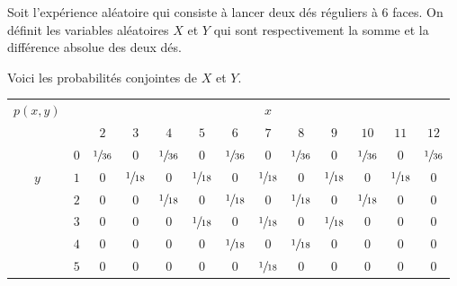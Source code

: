 \begin{questions}
\question Soit l'expérience aléatoire qui consiste à lancer deux dés réguliers à 6 faces. 
On définit les variables aléatoires $X$ et $Y$ qui sont respectivement la somme et la différence absolue des deux dés.

Voici les probabilités conjointes de $X$ et $Y$.


\begin{center}

\begin{tabular}{cc|*{11}{c}|}
$p(x,y)$ & & \multicolumn{11}{c|}{$x$}  \\
 & & $2$ & $3$ & $4$ & $5$ & $6$ & $7$ & $8$ & $9$ & $10$ & $11$ & $12$ \\
\hline
 & $0$ & $\sfrac{1}{36}$ & 0 & $\sfrac{1}{36}$ & 0  & $\sfrac{1}{36}$ &  0 & $\sfrac{1}{36}$ & 0  & $\sfrac{1}{36}$ & 0  & $\sfrac{1}{36}$ \\
$y$ & $1$ & 0  & $\sfrac{1}{18}$ &  0 & $\sfrac{1}{18}$ &   0& $\sfrac{1}{18}$ & 0  & $\sfrac{1}{18}$ &   0& $\sfrac{1}{18}$ & 0 \\
 & $2$ &  0 &  0 & $\sfrac{1}{18}$ &  0 & $\sfrac{1}{18}$ & 0  & $\sfrac{1}{18}$ & 0  & $\sfrac{1}{18}$ &0   & 0  \\
 & $3$ &  0 &  0 & 0  & $\sfrac{1}{18}$ & 0  & $\sfrac{1}{18}$ & 0  & $\sfrac{1}{18}$ & 0  &  0 & 0  \\
 & $4$ &  0 &  0 &  0 &0   & $\sfrac{1}{18}$ &  0 & $\sfrac{1}{18}$ &  0 & 0  &  0 & 0  \\
 & $5$ &  0 &  0 &   0& 0  &0   & $\sfrac{1}{18}$ & 0  & 0  &  0 & 0  &  0 \\
\hline

\end{tabular}

\end{center}

\end{questions}
